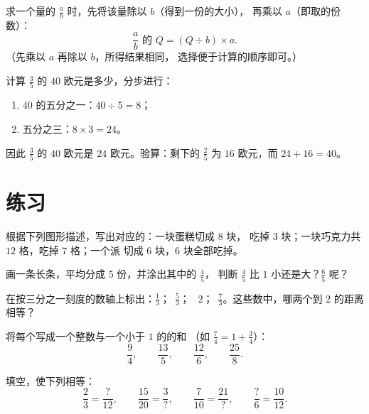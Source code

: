\begin{method}[求一个量的几分之几]\label{met:g6:fractions:ofquantity}
求一个量的 $\frac ab$ 时，先将该量除以 $b$（得到一份的大小），
再乘以 $a$（即取的份数）：
\[
\frac ab \text{ 的 } Q = (Q \div b) \times a .
\]
（先乘以 $a$ 再除以 $b$，所得结果相同，
选择便于计算的顺序即可。）
\end{method}

\begin{example}\label{ex:g6:fractions:ofquantity}
计算 $\frac35$ 的 $40$ 欧元是多少，分步进行：
\begin{enumerate}
  \item $40$ 的五分之一：$40 \div 5 = 8$；
  \item 五分之三：$8 \times 3 = 24$。
\end{enumerate}
因此 $\frac35$ 的 $40$ 欧元是 $24$ 欧元。验算：剩下的
$\frac25$ 为 $16$ 欧元，而 $24 + 16 = 40$。
\end{example}

\section{练习}

\begin{exercise}[$\star$]\label{exo:g6:fractions:1}
根据下列图形描述，写出对应的：一块蛋糕切成 $8$ 块，
吃掉 $3$ 块；一块巧克力共 $12$ 格，吃掉 $7$ 格；一个派
切成 $6$ 块，$6$ 块全部吃掉。
\end{exercise}

\begin{exercise}[$\star$]\label{exo:g6:fractions:2}
画一条长条，平均分成 $5$ 份，并涂出其中的 $\frac45$，
判断 $\frac45$ 比 $1$ 小还是大？$\frac65$ 呢？
\end{exercise}

\begin{exercise}[$\star$]\label{exo:g6:fractions:3}
在按三分之一刻度的数轴上标出：$\frac13$；\ $\frac53$；
\ $2$；\ $\frac73$。这些数中，哪两个到
$2$ 的距离相等？
\end{exercise}

\begin{exercise}[$\star$]\label{exo:g6:fractions:4}
将每个写成一个整数与一个小于 $1$ 的的和
（如 $\frac74 = 1 + \frac34$）：
\[
\frac{9}{4}, \qquad \frac{13}{5}, \qquad \frac{12}{6}, \qquad
\frac{25}{8} .
\]
\end{exercise}

\begin{exercise}[$\star$]\label{exo:g6:fractions:5}
填空，使下列相等：
\[
\frac{2}{3} = \frac{?}{12}, \qquad
\frac{15}{20} = \frac{3}{?}, \qquad
\frac{7}{10} = \frac{21}{?}, \qquad
\frac{?}{6} = \frac{10}{12}.
\]
\end{exercise}

